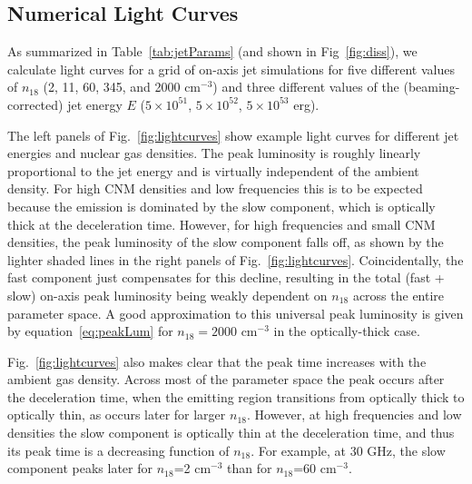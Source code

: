 \documentclass[usenatbib,fleqn]{mnras}
\begin{document}
\subsection{Numerical Light Curves}
\label{sec:numResults}
As summarized in Table~\ref{tab:jetParams} (and shown in
Fig~\ref{fig:diss}), we calculate light curves for a grid of on-axis
jet simulations for five different values of $n_{18}$ (2, 11, 60, 345,
and 2000 cm$^{-3}$) and three different values of the
(beaming-corrected) jet energy $E$ ($5\times 10^{51}$, $5\times
10^{52}$, $5\times 10^{53}$ erg).

The left panels of Fig.~\ref{fig:lightcurves} show example light
curves for different jet energies and nuclear gas densities. The peak
luminosity is roughly linearly proportional to the jet energy and is
virtually independent of the ambient density.  For high CNM densities
and low frequencies this is to be expected because the emission is
dominated by the slow component, which is optically thick at the
deceleration time. However, for high frequencies and small CNM
densities, the peak luminosity of the slow component falls off, as
shown by the lighter shaded lines in the right panels of
Fig.~\ref{fig:lightcurves}. Coincidentally, the fast component just
compensates for this decline, resulting in the total (fast + slow)
on-axis peak luminosity being weakly dependent on $n_{18}$ across the entire
parameter space.  A good approximation to this universal peak
luminosity is given by equation~\ref{eq:peakLum} for $n_{18}=2000$
cm$^{-3}$ in the optically-thick case.


Fig.~\ref{fig:lightcurves} also makes clear that the peak time
increases with the ambient gas density.  Across most of the parameter
space the peak occurs after the deceleration time, when the emitting
region transitions from optically thick to optically thin, as occurs
later for larger $n_{18}$. However, at high frequencies and low
densities the slow component is optically thin at the deceleration
time, and thus its peak time is a decreasing function of $n_{18}$. For
example, at 30 GHz, the slow component peaks later for $n_{18}$=2
cm$^{-3}$ than for $n_{18}$=60 cm$^{-3}$.
\end{document}
